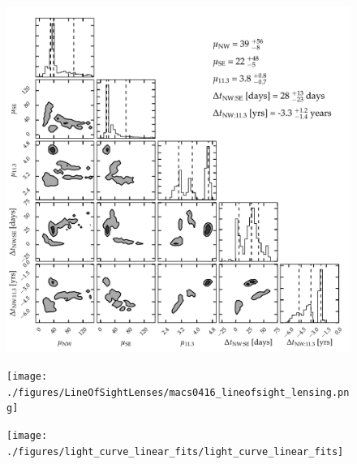 \documentclass{nature_arxiv}
\begin{document}










\begin{figure}[tbp]
  \begin{center}
    \includegraphics[width=\textwidth]{./figures/composite_lens_model_contours/composite_lens_model_contours}
    \caption{ \protect}
  \end{center}
\end{figure}

\begin{figure}[tbp]
  \begin{center}
    \texttt{[image: ./figures/LineOfSightLenses/macs0416\_lineofsight\_lensing.png]}
    \caption{\protect}
  \end{center}
\end{figure}

\begin{figure}[tbp]
  \begin{center}
    \texttt{[image: ./figures/light\_curve\_linear\_fits/light\_curve\_linear\_fits]}
    \caption{\protect}
  \end{center}
\end{figure}
\end{document}
